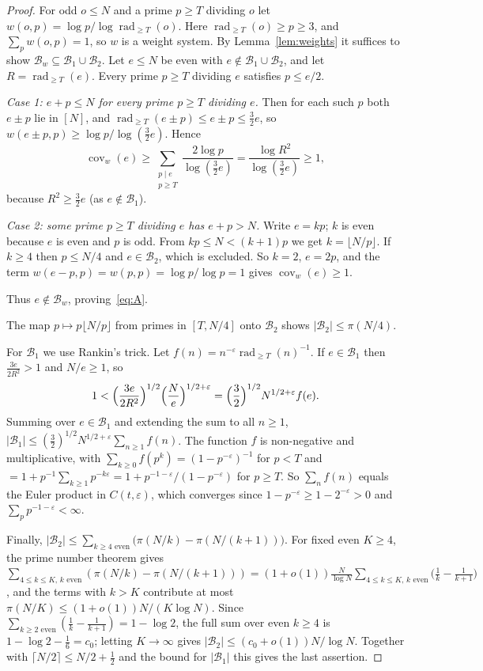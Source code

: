 \documentclass[11pt]{amsart}
\theoremstyle{definition}
\theoremstyle{remark}
\newcommand{\rad}{\operatorname{rad}}
\newcommand{\cov}{\operatorname{cov}}
\newcommand{\Bad}{\mathcal{B}}
\begin{document}
\begin{proof}
For odd $o\le N$ and a prime $p\ge T$ dividing $o$ let $w(o,p)=\log p/\log\rad_{\ge T}(o)$. Here $\rad_{\ge T}(o)\ge p\ge3$, and $\sum_pw(o,p)=1$, so $w$ is a weight system. By Lemma~\ref{lem:weights} it suffices to show $\Bad_w\subseteq\Bad_1\cup\Bad_2$. Let $e\le N$ be even with $e\notin\Bad_1\cup\Bad_2$, and let $R=\rad_{\ge T}(e)$. Every prime $p\ge T$ dividing $e$ satisfies $p\le e/2$.

\emph{Case 1: $e+p\le N$ for every prime $p\ge T$ dividing $e$.} Then for each such $p$ both $e\pm p$ lie in $[N]$, and $\rad_{\ge T}(e\pm p)\le e\pm p\le\frac32e$, so $w(e\pm p,p)\ge\log p/\log(\frac32e)$. Hence
\[
\cov_w(e)\ge\sum_{\substack{p\mid e\\ p\ge T}}\frac{2\log p}{\log(\frac32e)}=\frac{\log R^2}{\log(\frac32e)}\ge1,
\]
because $R^2\ge\frac32e$ (as $e\notin\Bad_1$).

\emph{Case 2: some prime $p\ge T$ dividing $e$ has $e+p>N$.} Write $e=kp$; $k$ is even because $e$ is even and $p$ is odd. From $kp\le N<(k+1)p$ we get $k=\lfloor N/p\rfloor$. If $k\ge4$ then $p\le N/4$ and $e\in\Bad_2$, which is excluded. So $k=2$, $e=2p$, and the term $w(e-p,p)=w(p,p)=\log p/\log p=1$ gives $\cov_w(e)\ge1$.

Thus $e\notin\Bad_w$, proving~\eqref{eq:A}.

The map $p\mapsto p\lfloor N/p\rfloor$ from primes in $[T,N/4]$ onto $\Bad_2$ shows $|\Bad_2|\le\pi(N/4)$.

For $\Bad_1$ we use Rankin's trick. Let $f(n)=n^{-\varepsilon}\rad_{\ge T}(n)^{-1}$. If $e\in\Bad_1$ then $\frac{3e}{2R^2}>1$ and $N/e\ge1$, so
\[
1<\Bigl(\frac{3e}{2R^2}\Bigr)^{1/2}\Bigl(\frac Ne\Bigr)^{1/2+\varepsilon}=\Bigl(\frac32\Bigr)^{1/2}N^{1/2+\varepsilon}f(e).
\]
Summing over $e\in\Bad_1$ and extending the sum to all $n\ge1$,
$|\Bad_1|\le(\frac32)^{1/2}N^{1/2+\varepsilon}\sum_{n\ge1}f(n)$. The function $f$ is non-negative and multiplicative, with $\sum_{k\ge0}f(p^k)=(1-p^{-\varepsilon})^{-1}$ for $p<T$ and $=1+p^{-1}\sum_{k\ge1}p^{-k\varepsilon}=1+p^{-1-\varepsilon}/(1-p^{-\varepsilon})$ for $p\ge T$. So $\sum_nf(n)$ equals the Euler product in $C(t,\varepsilon)$, which converges since $1-p^{-\varepsilon}\ge1-2^{-\varepsilon}>0$ and $\sum_pp^{-1-\varepsilon}<\infty$.

Finally, $|\Bad_2|\le\sum_{k\ge4\text{ even}}\bigl(\pi(N/k)-\pi(N/(k+1))\bigr)$. For fixed even $K\ge4$, the prime number theorem gives $\sum_{4\le k\le K,\,k\text{ even}}(\pi(N/k)-\pi(N/(k+1)))=(1+o(1))\frac{N}{\log N}\sum_{4\le k\le K,\,k\text{ even}}\bigl(\frac1k-\frac1{k+1}\bigr)$, and the terms with $k>K$ contribute at most $\pi(N/K)\le(1+o(1))N/(K\log N)$. Since $\sum_{k\ge2\text{ even}}(\frac1k-\frac1{k+1})=1-\log2$, the full sum over even $k\ge4$ is $1-\log2-\frac16=c_0$; letting $K\to\infty$ gives $|\Bad_2|\le(c_0+o(1))N/\log N$. Together with $\lceil N/2\rceil\le N/2+\frac12$ and the bound for $|\Bad_1|$ this gives the last assertion.
\end{proof}
\end{document}
